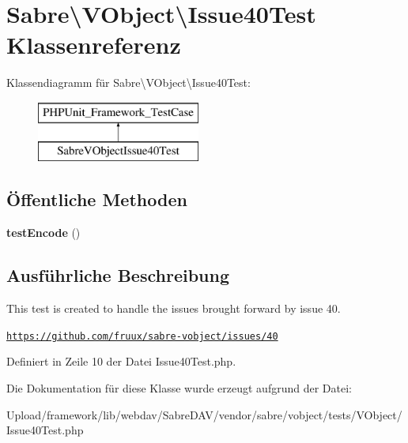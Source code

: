 \hypertarget{class_sabre_1_1_v_object_1_1_issue40_test}{}\section{Sabre\textbackslash{}V\+Object\textbackslash{}Issue40\+Test Klassenreferenz}
\label{class_sabre_1_1_v_object_1_1_issue40_test}
Klassendiagramm für Sabre\textbackslash{}V\+Object\textbackslash{}Issue40\+Test\+:\begin{figure}[H]
\begin{center}
\leavevmode
\includegraphics[height=2.000000cm]{class_sabre_1_1_v_object_1_1_issue40_test}
\end{center}
\end{figure}
\subsection*{Öffentliche Methoden}
\begin{DoxyCompactItemize}
\item 
\mbox{\label{class_sabre_1_1_v_object_1_1_issue40_test_a4dcf3e874cdc1207429240a36ada238f}} 
{\bfseries test\+Encode} ()
\end{DoxyCompactItemize}


\subsection{Ausführliche Beschreibung}
This test is created to handle the issues brought forward by issue 40.

\href{https://github.com/fruux/sabre-vobject/issues/40}{\tt https\+://github.\+com/fruux/sabre-\/vobject/issues/40} 

Definiert in Zeile 10 der Datei Issue40\+Test.\+php.



Die Dokumentation für diese Klasse wurde erzeugt aufgrund der Datei\+:\begin{DoxyCompactItemize}
\item 
Upload/framework/lib/webdav/\+Sabre\+D\+A\+V/vendor/sabre/vobject/tests/\+V\+Object/Issue40\+Test.\+php\end{DoxyCompactItemize}
